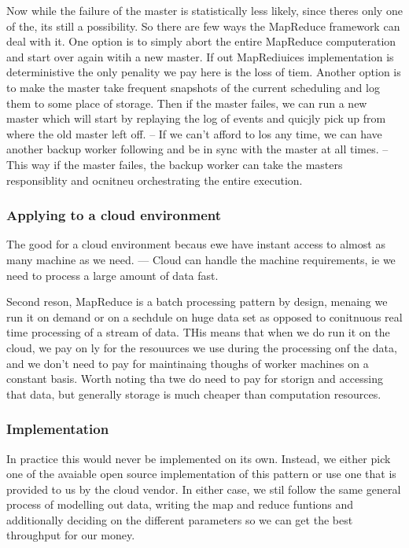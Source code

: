 \documentclass[a4paper, 11pt]{book}
\begin{document}
{    Now while the failure of the master is statistically less likely, since theres only one of the, its still a possibility.
    So there are few ways the MapReduce framework can deal with it.
    One option is to simply abort the entire MapReduce computeration and start over again witih a new master.
    If out MapRediuices implementation is deterministive the only penality we pay here is the loss of tiem.
    Another option is to make the master take frequent snapshots of the current scheduling and log them to some place of storage.
    Then if the master failes, we can run a new master which will start by replaying the log of events and quicjly pick up from where the old master left off.
    -- If we can't afford to los any time, we can have another backup worker following and be in sync with the master at all times.
    -- This way if the master failes, the backup worker can take the masters responsiblity and ocnitneu orchestrating the entire execution.

    \subsubsection{Applying to a cloud environment}
    The good for a cloud environment becaus ewe have instant access to almost as many machine as we need.
    --- Cloud can handle the machine requirements, ie we need to process a large amount of data fast.

    Second reson, MapReduce is a batch processing pattern by design, menaing we run it on demand or on a sechdule on huge data set as opposed to conitnuous real time processing of a stream of data.
    THis means that when we do run it on the cloud, we pay on ly for the resouurces we use during the processing onf the data, and we don't need to pay for maintinaing thoughs of worker machines on a constant basis.
    Worth noting tha twe do need to pay for storign and accessing that data, but generally storage is much cheaper than computation resources.

    \subsubsection{Implementation}
    In practice this would never be implemented on its own.
    Instead, we either pick one of the avaiable open source implementation of this pattern or use one that is provided to us by the cloud vendor.
    In either case, we stil follow the same general process of modelling out data, writing the map and reduce funtions and additionally deciding on the different parameters so we can get the best throughput for our money.

}
\end{document}
